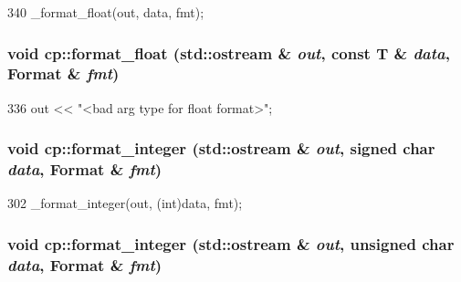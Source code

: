 \begin{DoxyCode}
340 { _format_float(out, data, fmt); }
\end{DoxyCode}
\hypertarget{namespacecp_a63b4184f62502d169eea5a4d2d66ebba}{
\subsubsection[{format\_\-float}]{\setlength{\rightskip}{0pt plus 5cm}void cp::format\_\-float (std::ostream \& {\em out}, \/  const T \& {\em data}, \/  Format \& {\em fmt})}}
\label{namespacecp_a63b4184f62502d169eea5a4d2d66ebba}



\begin{DoxyCode}
336 { out << "<bad arg type for float format>"; }
\end{DoxyCode}
\hypertarget{namespacecp_a0c00898edd5c59413de79d1e79afc0d2}{
\subsubsection[{format\_\-integer}]{\setlength{\rightskip}{0pt plus 5cm}void cp::format\_\-integer (std::ostream \& {\em out}, \/  signed char {\em data}, \/  Format \& {\em fmt})}}
\label{namespacecp_a0c00898edd5c59413de79d1e79afc0d2}



\begin{DoxyCode}
302 { _format_integer(out, (int)data, fmt); }
\end{DoxyCode}
\hypertarget{namespacecp_adbaf7e97e476a81d8f558dba458de4e4}{
\subsubsection[{format\_\-integer}]{\setlength{\rightskip}{0pt plus 5cm}void cp::format\_\-integer (std::ostream \& {\em out}, \/  unsigned char {\em data}, \/  Format \& {\em fmt})}}
\label{namespacecp_adbaf7e97e476a81d8f558dba458de4e4}



